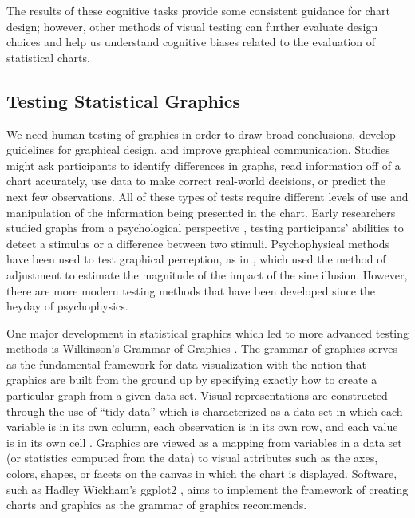 \documentclass[12pt]{article}
\begin{document}
The results of these cognitive tasks provide some consistent guidance
for chart design; however, other methods of visual testing can further
evaluate design choices and help us understand cognitive biases related
to the evaluation of statistical charts.

\hypertarget{testing-statistical-graphics}{%
\subsection{Testing Statistical
Graphics}\label{testing-statistical-graphics}}

We need human testing of graphics in order to draw broad conclusions,
develop guidelines for graphical design, and improve graphical
communication. Studies might ask participants to identify differences in
graphs, read information off of a chart accurately, use data to make
correct real-world decisions, or predict the next few observations. All
of these types of tests require different levels of use and manipulation
of the information being presented in the chart. Early researchers
studied graphs from a psychological perspective
\citep{spence1990visual, lewandowsky1989perception}, testing
participants' abilities to detect a stimulus or a difference between two
stimuli. Psychophysical methods have been used to test graphical
perception, as in \citet{vanderplas2015signs}, which used the method of
adjustment to estimate the magnitude of the impact of the sine illusion.
However, there are more modern testing methods that have been developed
since the heyday of psychophysics.

One major development in statistical graphics which led to more advanced
testing methods is Wilkinson's Grammar of Graphics
\citep{wilkinson2013grammar}. The grammar of graphics serves as the
fundamental framework for data visualization with the notion that
graphics are built from the ground up by specifying exactly how to
create a particular graph from a given data set. Visual representations
are constructed through the use of ``tidy data'' which is characterized
as a data set in which each variable is in its own column, each
observation is in its own row, and each value is in its own cell
\citep{wickham2016r}. Graphics are viewed as a mapping from variables in
a data set (or statistics computed from the data) to visual attributes
such as the axes, colors, shapes, or facets on the canvas in which the
chart is displayed. Software, such as Hadley Wickham's ggplot2
\citep{wickham2011ggplot2}, aims to implement the framework of creating
charts and graphics as the grammar of graphics recommends.
\end{document}
